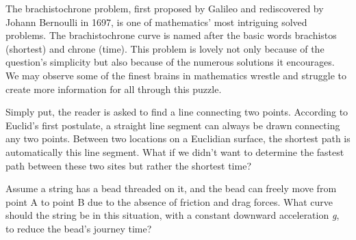 



{The brachistochrone problem, first proposed by Galileo and rediscovered by Johann Bernoulli in 1697, is one of mathematics' most intriguing solved problems. The brachistochrone curve is named after the basic words brachistos (shortest) and chrone (time). This problem is lovely not only because of the question's simplicity but also because of the numerous solutions it encourages. We may observe some of the finest brains in mathematics wrestle and struggle to create more information for all through this puzzle.}

{Simply put, the reader is asked to find a line connecting two points. According to Euclid's first postulate, a straight line segment can always be drawn connecting any two points. Between two locations on a Euclidian surface, the shortest path is automatically this line segment. What if we didn't want to determine the fastest path between these two sites but rather the shortest time?}

{Assume a string has a bead threaded on it, and the bead can freely move from point A to point B due to the absence of friction and drag forces. What curve should the string be in this situation, with a constant downward acceleration \textit{g}, to reduce the bead's journey time?}

